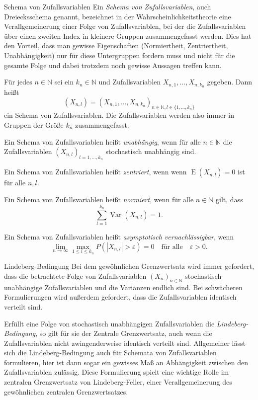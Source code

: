 \begin{defi}{Schema von Zufallsvariablen}
    Ein \emph{Schema von Zufallsvariablen}, auch Dreiecksschema genannt, bezeichnet in der Wahrscheinlichkeitstheorie eine Verallgemeinerung einer Folge von Zufallsvariablen, bei der die Zufallsvariablen über einen zweiten Index in kleinere Gruppen zusammengefasst werden.
    Dies hat den Vorteil, dass man gewisse Eigenschaften (Normiertheit, Zentriertheit, Unabhängigkeit) nur für diese Untergruppen fordern muss und nicht für die gesamte Folge und dabei trotzdem noch gewisse Aussagen treffen kann.

    Für jedes $n \in \mathbb{N}$ sei ein $k_n \in \mathbb{N}$ und Zufallsvariablen $X_{n,1}, \ldots, X_{n,k_n}$ gegeben.
    Dann heißt
    \[
        \left( X_{n,l} \right) = \left( X_{n,1}, \ldots, X_{n,k_n} \right)_{n \in \mathbb{N}, l \in \{1, \ldots, k_n\}}
    \]
    ein Schema von Zufallsvariablen.
    Die Zufallsvariablen werden also immer in Gruppen der Größe $k_n$ zusammengefasst.

    Ein Schema von Zufallsvariablen heißt \emph{unabhängig}, wenn für alle $n\in \mathbb {N}$ die Zufallsvariablen $(X_{n,l})_{l=1,\dots ,k_{n}}$ stochastisch unabhängig sind.

    Ein Schema von Zufallsvariablen heißt \emph{zentriert}, wenn  wenn $\operatorname {E} (X_{n,l})=0$ ist für alle $n,l$.

    Ein Schema von Zufallsvariablen heißt \emph{normiert}, wenn für alle $n\in \mathbb {N}$ gilt, dass
    \[
        \displaystyle \sum _{l=1}^{k_{n}}\operatorname {Var} (X_{n,l})=1.
    \]

    Ein Schema von Zufallsvariablen heißt \emph{asymptotisch vernachlässigbar}, wenn
    \[
        \lim _{n\to \infty }\max _{1\leq l\leq k_{n}}P(|X_{n,l}|>\varepsilon )=0 \quad \text{für alle} \quad \varepsilon >0.
    \]
\end{defi}

\begin{defi}{Lindeberg-Bedingung}
    Bei dem gewöhnlichen Grenzwertsatz wird immer gefordert, dass die betrachtete Folge von Zufallsvariablen $(X_{n})_{n\in \mathbb {N}}$ stochastisch unabhängige Zufallsvariablen und die Varianzen endlich sind.
    Bei schwächeren Formulierungen wird außerdem gefordert, dass die Zufallsvariablen identisch verteilt sind.

    Erfüllt eine Folge von stochastisch unabhängigen Zufallsvariablen die \emph{Lindeberg-Bedingung}, so gilt für sie der Zentrale Grenzwertsatz, auch wenn die Zufallsvariablen nicht zwingenderweise identisch verteilt sind.
    Allgemeiner lässt sich die Lindeberg-Bedingung auch für Schemata von Zufallsvariablen formulieren, hier ist dann sogar ein gewisses Maß an Abhängigkeit zwischen den Zufallsvariablen zulässig.
    Diese Formulierung spielt eine wichtige Rolle im zentralen Grenzwertsatz von Lindeberg-Feller, einer Verallgemeinerung des gewöhnlichen zentralen Grenzwertsatzes.
\end{defi}


